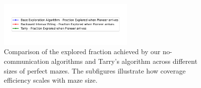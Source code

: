 \begin{figure}[H]
    \centering
    \qquad
    \qquad
    \includegraphics[width=0.6\textwidth]{Cap3/no_comm_fraction_legend.pdf}
    \newline
    \qquad
    \newline
    \qquad
    \caption{Comparison of the explored fraction achieved by our no-communication algorithms and Tarry's algorithm across different sizes of perfect mazes. The subfigures illustrate how coverage efficiency scales with maze size.}
    \label{fig_no_comm_fraction_all_sizes_maze}
\end{figure}

